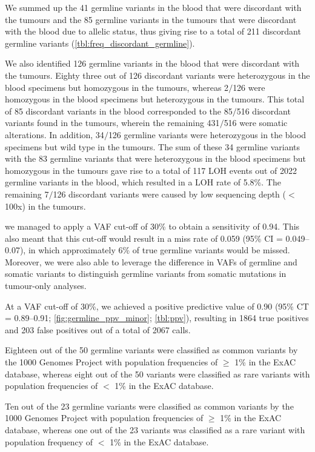 We summed up the 41 germline variants in the blood that were discordant with the tumours and the 85 germline variants in the tumours that were discordant with the blood due to allelic status, thus giving rise to a total of 211 discordant germline variants (\autoref{tbl:freq_discordant_germline}).

We also identified 126 germline variants in the blood that were discordant with the tumours. Eighty three out of 126 discordant variants were heterozygous in the blood specimens but homozygous in the tumours, whereas 2$/$126 were homozygous in the blood specimens but heterozygous in the tumours. This total of 85 discordant variants in the blood corresponded to the 85$/$516 discordant variants found in the tumours, wherein the remaining 431$/$516 were somatic alterations. In addition, 34$/$126 germline variants were heterozygous in the blood specimens but wild type in the tumours. The sum of these 34 germline variants with the 83 germline variants that were heterozygous in the blood specimens but homozygous in the tumours gave rise to a total of 117 LOH events out of 2022 germline variants in the blood, which resulted in a LOH rate of 5.8\%. The remaining 7$/$126 discordant variants were caused by low sequencing depth ($<$ 100x) in the tumours.

we managed to apply a VAF cut-off of 30\% to obtain a sensitivity of 0.94. This also meant that this cut-off would result in a miss rate of 0.059 (95\% CI = 0.049--0.07), in which approximately 6\% of true germline variants would be missed. Moreover, we were also able to leverage the difference in VAFs of germline and somatic variants to distinguish germline variants from somatic mutations in tumour-only analyses.

At a VAF cut-off of 30\%, we achieved a positive predictive value of 0.90 (95\% CT = 0.89--0.91; \autoref{fig:germline_ppv_minor}; \autoref{tbl:ppv}), resulting in 1864 true positives and 203 false positives out of a total of 2067 calls.

Eighteen out of the 50 germline variants were classified as common variants by the 1000 Genomes Project with population frequencies of $\geq$ 1\% in the ExAC database, whereas eight out of the 50 variants were classified as rare variants with population frequencies of $<$ 1\% in the ExAC database.

Ten out of the 23 germline variants were classified as common variants by the 1000 Genomes Project with population frequencies of $\geq$ 1\% in the ExAC database, whereas one out of the 23 variants was classified as a rare variant with population frequency of $<$ 1\% in the ExAC database.

